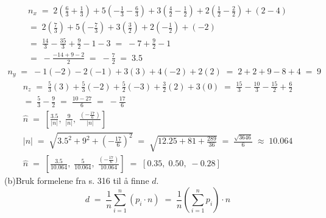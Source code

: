 \documentclass[12pt, a4paper]{article}
\begin{document}
		\begin{equation*}
			\begin{aligned}
					n_x\;=\;2\left(\frac{6}{3}+\frac{1}{3}
					\right)+5\left(-\frac{1}{3}-\frac{6}{3}
					\right)+3\left(\frac{4}{2}-\frac{1}{2}
					\right)+2\left(\frac{1}{2}-\frac{2}{2}
					\right)+(2-4)\\
					=\;2\left(\frac{7}{3}\right)+
					5\left(-\frac{7}{3}\right)+
					3\left(\frac{3}{2}\right)+
					2\left(-\frac{1}{2}\right)+(-2)\\								=\;\frac{14}{3}-\frac{35}{3}+
					\frac{9}{2}-1-3
					\;=\;-7+\frac{9}{2}-1\\
					=\;-\frac{-14+9-2}{2}\;=\;-\frac{7}{2}
					\;=\;3.5
			\end{aligned}
		\end{equation*}
		\begin{equation*}
			\begin{aligned}
				n_y\;=\;-1(-2)-2(-1)+3(3)+4(-2)+2(2)\;=\;
				2+2+9-8+4\;=\;9
			\end{aligned}
		\end{equation*}
		\begin{equation*}
			\begin{aligned}
				n_z\;=\;\frac{5}{3}(3)+\frac{5}{3}(-2)
				+\frac{5}{2}(-3)+\frac{3}{2}(2)+3(0)
				\;=\;\frac{15}{3}-\frac{10}{3}
				-\frac{15}{2}+\frac{6}{2}\\=\;
				\frac{5}{3}-\frac{9}{2}\;=\;
				\frac{10-27}{6}\;=\;-\frac{17}{6}
			\end{aligned}
		\end{equation*}
\newpage\quad
		\begin{gather}
			\tag*{}
				\hat{n}\;=\;\left[
					\frac{3.5}{|n|},\;
					\frac{9}{|n|},\;
					\frac{\left(-\frac{17}{6}\right)}{|n|}
				\right]\\
			\tag*{}
				|n|\;=\;\sqrt{
					3.5^2+9^2+\left(-\frac{17}{6}\right)^2
				}\;=\;\sqrt{12.25+81+\frac{289}{36}}
				\;=\;\frac{\sqrt{3646}}{6}
				\;\approx\;10.064\\
			\tag*{}
				\hat{n}\;=\;\left[
						\frac{3.5}{10.064},\;
						\frac{5}{10.064},\;
						\frac{\left(-\frac{17}{6}\right)}
						{10.064}					
				\right]\;=\;\left[
					0.35,\;0.50,\;-0.28
				\right]
		\end{gather}
	(b)\quad Bruk formelene fra s. 316 til å finne $d$.
			\begin{equation*}
				d\;=\;\frac{1}{n}\sum_{i=1}^{n}\left(
					p_i \cdot n
				\right)\;=\;\frac{1}{n}\left(
					\sum_{i=1}^{n}p_i
				\right)\cdot n
			\end{equation*}
\end{document}
